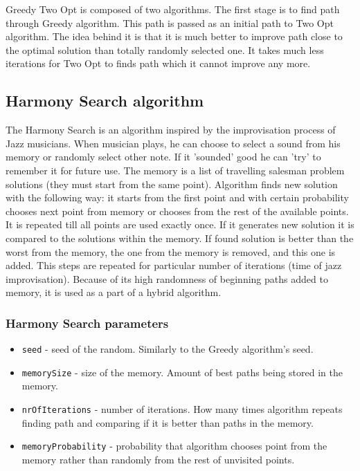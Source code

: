 \documentclass[titlepage]{article}
\begin{document}
Greedy Two Opt is composed of two algorithms. The first stage is to find path through Greedy algorithm. This path is passed as an initial path to Two Opt algorithm. The idea behind it is that it is much better to improve path close to the optimal solution than totally randomly selected one. It takes much less iterations for Two Opt to finds path which it cannot improve any more. 

\subsection{Harmony Search algorithm}

The Harmony Search is an algorithm inspired by the improvisation process of Jazz musicians. When musician plays, he can choose to select a sound from his memory or randomly select other note. If it 'sounded' good he can 'try' to remember it for future use. The memory is a list of travelling salesman problem solutions (they must start from the same point). Algorithm finds new solution with the following way: it starts from the first point and with certain probability chooses next point from memory or chooses from the rest of the available points. It is repeated till all points are used exactly once. If it generates new solution it is compared to the solutions within the memory. If found solution is better than the worst from the memory, the one from the memory is removed, and this one is added. This steps are repeated for particular number of iterations (time of jazz improvisation). Because of its high randomness of beginning paths added to memory, it is used as a part of a hybrid algorithm.

\subsubsection{Harmony Search parameters}

\begin{itemize}
	\item \texttt{seed} - seed of the random. Similarly to the Greedy algorithm's seed.
	
	\item \texttt{memorySize} - size of the memory. Amount of best paths being stored in the memory.
	
	\item \texttt{nrOfIterations} - number of iterations. How many times algorithm repeats finding path and comparing if it is better than paths in the memory.
	
	\item \texttt{memoryProbability} - probability that algorithm chooses point from the memory rather than randomly from the rest of unvisited points.
\end{itemize}
\end{document}

